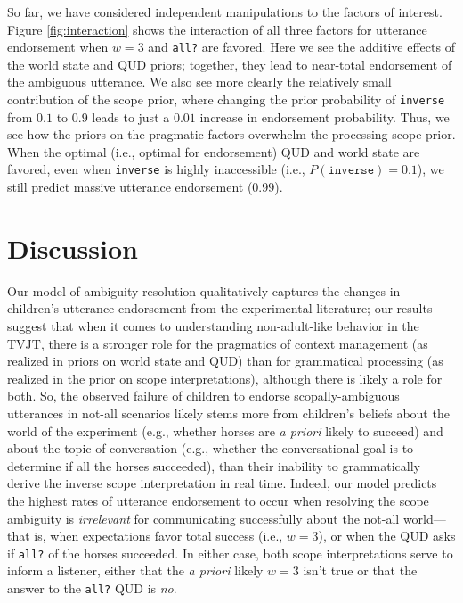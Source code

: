 \documentclass[10pt,a4paper]{article}
\begin{document}
So far, we have considered independent manipulations to the factors of interest. Figure \ref{fig:interaction} shows the interaction of all three factors for utterance endorsement when $w=3$ and \texttt{all?} are favored.
Here we see the additive effects of the world state and QUD priors; together, they lead to near-total endorsement of the ambiguous utterance. We also see more clearly the relatively small contribution of the scope prior, where changing the prior probability of \texttt{inverse} from $0.1$ to $0.9$ leads to just a $0.01$ increase in endorsement probability.  Thus, we see how the priors on the pragmatic  factors overwhelm the processing scope prior. When the optimal (i.e., optimal for endorsement) QUD and world state are favored, even when \texttt{inverse} is highly inaccessible (i.e., $P(\texttt{inverse}) = 0.1$), we still predict massive utterance endorsement ($0.99$).



\section{Discussion}

Our model of ambiguity resolution qualitatively captures the changes in children's utterance endorsement from the experimental literature;
our results suggest that when it comes to understanding non-adult-like behavior in the TVJT, there is a stronger role for the pragmatics of context management (as realized in priors on world state and QUD) than for grammatical processing (as realized in the prior on scope interpretations), although there is likely a role for both. 
So, the observed failure of children to endorse scopally-ambiguous utterances in not-all scenarios likely stems more from children's beliefs about the world of the experiment (e.g., whether horses are \emph{a priori} likely to succeed) and about the topic of conversation (e.g., whether the conversational goal is to determine if all the horses succeeded), than their inability to grammatically derive the inverse scope interpretation in real time.  
Indeed, our model predicts the highest rates of utterance endorsement to occur when resolving the scope ambiguity is \emph{irrelevant} for communicating successfully about the not-all world---that is, when expectations favor total success (i.e., $w=3$), or when the QUD asks if \texttt{all?} of the horses succeeded. In either case, both scope interpretations serve to inform a listener, either that the \emph{a priori} likely $w=3$ isn't true or that the answer to the \texttt{all?} QUD is \emph{no}. 
\end{document}
